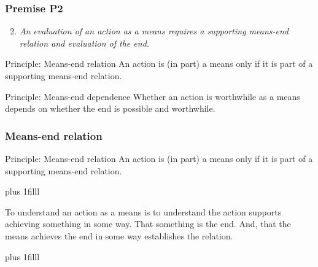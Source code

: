 \documentclass[noamssymb,
graphics,
]{beamer} %
\newcommand{\hozlinedash}[0]{
  \noindent\hdashrule[0.5ex][c]{\textwidth}{.1pt}{2.5pt}
}
\newcommand{\btVFill}{\vskip0pt plus 1filll}
\begin{document}
\begin{frame}
  \frametitle{Premise P2}
  {%
    \begin{enumerate}
      \setcounter{enumi}{1}
    \item \emph{An evaluation of an action as a means requires a supporting means-end relation and evaluation of the end.}
    \end{enumerate}
  }
  \hozlinedash

  \begin{block}{Principle: Means-end relation}
    An action is (in part) a means only if it is part of a supporting means-end relation.
  \end{block}

  \begin{block}{Principle: Means-end dependence}
    Whether an action is worthwhile as a means depends on whether the end is possible and worthwhile.
  \end{block}

\end{frame}

\begin{frame}
  \frametitle{Means-end relation}

  \begin{block}{Principle: Means-end relation}
    An action is (in part) a means only if it is part of a supporting means-end relation.
  \end{block}
  \btVFill
  \vspace{-10pt}

  To understand an action as a means is to understand the action supports achieving something in some way.
That something is the end.
And, that the means achieves the end in some way establishes the relation.

\btVFill
\end{frame}
\end{document}
